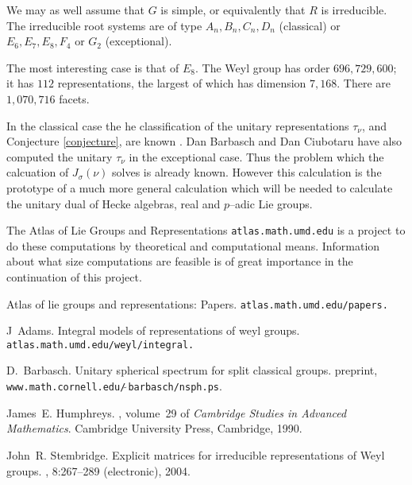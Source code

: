 \documentclass[11pt]{amsart}
\begin{document}
We may as well assume that $G$ is simple, or equivalently that $R$ is
irreducible. The irreducible root systems are of type
$A_n,B_n,C_n,D_n$ (classical) or $E_6,E_7,E_8, F_4$
or $G_2$ (exceptional).

The most interesting case is that of $E_8$.  The Weyl group has order
$696,729,600$; it has $112$ representations, the largest of which
has dimension $7,168$.  There are $1,070,716$ facets.

In the classical case the he classification of the unitary
representations $\tau_\nu$, and Conjecture \ref{conjecture},
are known \cite{barbasch_spherical}.
Dan Barbasch and Dan Ciubotaru have also computed the unitary
$\tau_\nu$ in the exceptional case.
Thus the problem which the calcuation of $J_\sigma(\nu)$ solves is
already known. However this calculation is the prototype of a much
more general calculation which will be needed to calculate the unitary
dual of Hecke algebras, real and $p$--adic Lie groups.


 The Atlas of Lie Groups and Representations {\tt atlas.math.umd.edu}
is a project to do these computations by theoretical and computational
means. Information about what size computations are feasible is of
great importance in the continuation of this project.





%
\def\cprime{$'$} \def\cftil#1{\ifmmode\setbox7\hbox{$\accent"5E#1$}\else
  \setbox7\hbox{\accent"5E#1}\penalty 10000\relax\fi\raise 1\ht7
  \hbox{\lower1.15ex\hbox to 1\wd7{\hss\accent"7E\hss}}\penalty 10000
  \hskip-1\wd7\penalty 10000\box7}
\begin{thebibliography}{1}

Atlas of lie groups and representations: Papers.
\newblock \tt atlas.math.umd.edu/papers.

J~Adams.
\newblock Integral models of representations of weyl groups.
\newblock \tt atlas.math.umd.edu/weyl/integral.

D.~Barbasch.
\newblock Unitary spherical spectrum for split classical groups.
\newblock preprint, {\tt www.math.cornell.edu/$\tilde{\ }$barbasch/nsph.ps}.

James~E. Humphreys.
, volume~29 of {\em
  Cambridge Studies in Advanced Mathematics}.
\newblock Cambridge University Press, Cambridge, 1990.

John~R. Stembridge.
\newblock Explicit matrices for irreducible representations of {W}eyl groups.
, 8:267--289 (electronic), 2004.

\end{thebibliography}
\end{document}
